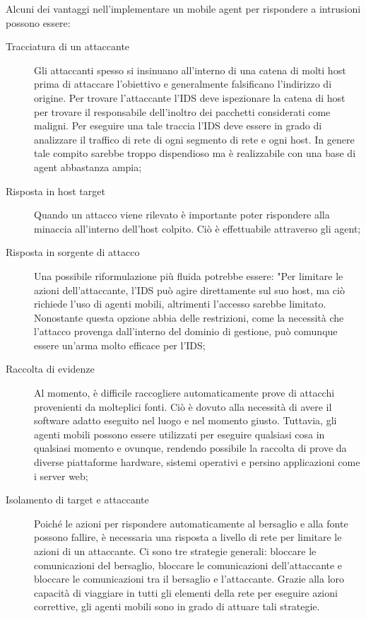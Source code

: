 Alcuni dei vantaggi nell'implementare un mobile agent per rispondere a intrusioni possono essere:
\begin{description}
    \item [Tracciatura di un attaccante] Gli attaccanti spesso si insinuano all'interno di una catena di molti host prima di attaccare l'obiettivo e generalmente falsificano l'indirizzo di origine. Per trovare l'attaccante l'IDS deve ispezionare la catena di host per trovare il responsabile dell'inoltro dei pacchetti considerati come maligni. Per eseguire una tale traccia l'IDS deve essere in grado di analizzare il traffico di rete di ogni segmento di rete e ogni host. In genere tale compito sarebbe troppo dispendioso ma è realizzabile  con una base di agent abbastanza ampia;
    \item [Risposta in host target] Quando un attacco viene rilevato è importante poter rispondere alla minaccia all'interno dell'host colpito. Ciò è effettuabile attraverso gli agent;
    \item [Risposta in sorgente di attacco] Una possibile riformulazione più fluida potrebbe essere: "Per limitare le azioni dell'attaccante, l'IDS può agire direttamente sul suo host, ma ciò richiede l'uso di agenti mobili, altrimenti l'accesso sarebbe limitato. Nonostante questa opzione abbia delle restrizioni, come la necessità che l'attacco provenga dall'interno del dominio di gestione, può comunque essere un'arma molto efficace per l'IDS;
    \item [Raccolta di evidenze] Al momento, è difficile raccogliere automaticamente prove di attacchi provenienti da molteplici fonti. Ciò è dovuto alla necessità di avere il software adatto eseguito nel luogo e nel momento giusto. Tuttavia, gli agenti mobili possono essere utilizzati per eseguire qualsiasi cosa in qualsiasi momento e ovunque, rendendo possibile la raccolta di prove da diverse piattaforme hardware, sistemi operativi e persino applicazioni come i server web;
    \item[Isolamento di target e attaccante] Poiché le azioni per rispondere automaticamente al bersaglio e alla fonte possono fallire, è necessaria  una risposta a livello di rete per limitare le azioni di un attaccante. Ci sono tre strategie generali: bloccare le comunicazioni del bersaglio, bloccare le comunicazioni dell'attaccante e bloccare le comunicazioni tra il bersaglio e l'attaccante. Grazie alla loro capacità di viaggiare in tutti gli elementi della rete per eseguire azioni correttive, gli agenti mobili sono in grado di attuare tali strategie.
\end{description}

